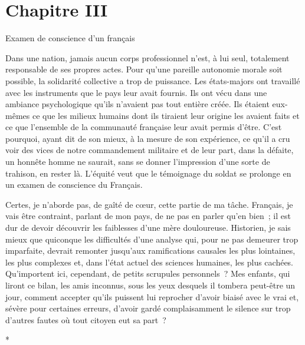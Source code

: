 \documentclass[french,twoside]{book} %
\newcommand\chapteropen{} %
\newcommand\chaptercont{} %
\begin{document}
\chapteropen

\chapter[{Chapitre III}]{Chapitre III}
\renewcommand{\leftmark}{Chapitre III}


\chaptercont

\begin{center}
Examen de conscience d’un français\par
\end{center}

\noindent   Dans une nation, jamais aucun corps professionnel n’est, à lui seul, totalement responsable de ses propres actes. Pour qu’une pareille autonomie morale soit possible, la solidarité collective a trop de puissance. Les états-majors ont travaillé avec les instruments que le pays leur avait fournis. Ils ont vécu dans une ambiance psychologique qu’ils n’avaient pas tout entière créée. Ils étaient eux-mêmes ce que les milieux humains dont ils tiraient leur origine les avaient faits et ce que l’ensemble de la communauté française leur avait permis d’être. C’est pourquoi, ayant dit de son mieux, à la mesure de son expérience, ce qu’il a cru voir des vices de notre commandement militaire et de leur part, dans la défaite, un honnête homme ne saurait, sans se donner l’impression d’une sorte de trahison, en rester là. L’équité veut que le témoignage du soldat se prolonge en un examen de conscience du Français.\par
Certes, je n’aborde pas, de gaîté de cœur, cette partie de ma tâche. Français, je vais être contraint, parlant de mon pays, de ne pas en parler qu’en bien ; il est dur de devoir découvrir les faiblesses d’une mère douloureuse. Historien, je sais mieux que quiconque les difficultés d’une analyse qui, pour ne pas demeurer trop imparfaite, devrait remonter jusqu’aux ramifications causales les plus lointaines, les plus complexes et, dans l’état actuel des sciences humaines, les plus cachées. Qu’importent ici, cependant, de petits scrupules personnels ? Mes enfants,   qui liront ce bilan, les amis inconnus, sous les yeux desquels il tombera peut-être un jour, comment accepter qu’ils puissent lui reprocher d’avoir biaisé avec le vrai et, sévère pour certaines erreurs, d’avoir gardé complaisamment le silence sur trop d’autres fautes où tout citoyen eut sa part ?\par

\begin{center}
*\par
\end{center}
\end{document}
